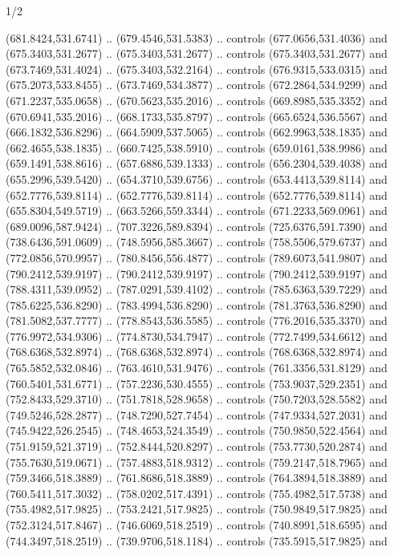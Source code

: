 \begin{flagdescription}{1/2}
\begin{scope}[xshift=0.5\flaglength,yshift=0.5\flagwidth,scale=\flagwidth/759]
\begin{scope}[y=0.8pt, x=0.8pt, yscale=-1,shift={(-720,-480)}]
\begin{scope}[cm={{1.14637,0.0,0.0,1.17117,(33.17849,82.1384)}}]
  (681.8424,531.6741) .. (679.4546,531.5383) .. controls (677.0656,531.4036) and
  (675.3403,531.2677) .. (675.3403,531.2677) .. controls (675.3403,531.2677) and
  (673.7469,531.4024) .. (675.3403,532.2164) .. controls (676.9315,533.0315) and
  (675.2073,533.8455) .. (673.7469,534.3877) .. controls (672.2864,534.9299) and
  (671.2237,535.0658) .. (670.5623,535.2016) .. controls (669.8985,535.3352) and
  (670.6941,535.2016) .. (668.1733,535.8797) .. controls (665.6524,536.5567) and
  (666.1832,536.8296) .. (664.5909,537.5065) .. controls (662.9963,538.1835) and
  (662.4655,538.1835) .. (660.7425,538.5910) .. controls (659.0161,538.9986) and
  (659.1491,538.8616) .. (657.6886,539.1333) .. controls (656.2304,539.4038) and
  (655.2996,539.5420) .. (654.3710,539.6756) .. controls (653.4413,539.8114) and
  (652.7776,539.8114) .. (652.7776,539.8114) .. controls (652.7776,539.8114) and
  (655.8304,549.5719) .. (663.5266,559.3344) .. controls (671.2233,569.0961) and
  (689.0096,587.9424) .. (707.3226,589.8394) .. controls (725.6376,591.7390) and
  (738.6436,591.0609) .. (748.5956,585.3667) .. controls (758.5506,579.6737) and
  (772.0856,570.9957) .. (780.8456,556.4877) .. controls (789.6073,541.9807) and
  (790.2412,539.9197) .. (790.2412,539.9197) .. controls (790.2412,539.9197) and
  (788.4311,539.0952) .. (787.0291,539.4102) .. controls (785.6363,539.7229) and
  (785.6225,536.8290) .. (783.4994,536.8290) .. controls (781.3763,536.8290) and
  (781.5082,537.7777) .. (778.8543,536.5585) .. controls (776.2016,535.3370) and
  (776.9972,534.9306) .. (774.8730,534.7947) .. controls (772.7499,534.6612) and
  (768.6368,532.8974) .. (768.6368,532.8974) .. controls (768.6368,532.8974) and
  (765.5852,532.0846) .. (763.4610,531.9476) .. controls (761.3356,531.8129) and
  (760.5401,531.6771) .. (757.2236,530.4555) .. controls (753.9037,529.2351) and
  (752.8433,529.3710) .. (751.7818,528.9658) .. controls (750.7203,528.5582) and
  (749.5246,528.2877) .. (748.7290,527.7454) .. controls (747.9334,527.2031) and
  (745.9422,526.2545) .. (748.4653,524.3549) .. controls (750.9850,522.4564) and
  (751.9159,521.3719) .. (752.8444,520.8297) .. controls (753.7730,520.2874) and
  (755.7630,519.0671) .. (757.4883,518.9312) .. controls (759.2147,518.7965) and
  (759.3466,518.3889) .. (761.8686,518.3889) .. controls (764.3894,518.3889) and
  (760.5411,517.3032) .. (758.0202,517.4391) .. controls (755.4982,517.5738) and
  (755.4982,517.9825) .. (753.2421,517.9825) .. controls (750.9849,517.9825) and
  (752.3124,517.8467) .. (746.6069,518.2519) .. controls (740.8991,518.6595) and
  (744.3497,518.2519) .. (739.9706,518.1184) .. controls (735.5915,517.9825) and

\end{scope}
\end{scope}
\end{scope}
\end{flagdescription}
